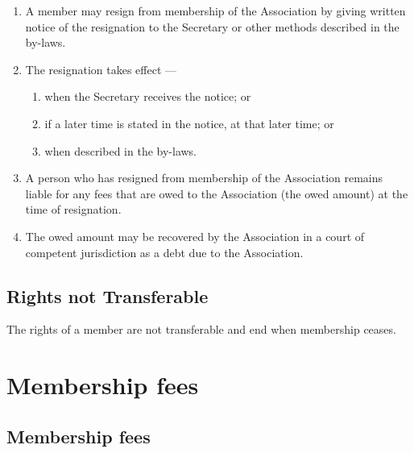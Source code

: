 \documentclass[../constitution.tex]{subfiles}
\begin{document}
\begin{enumerate}

\item A member may resign from membership of the Association by giving written notice of the resignation to the Secretary or other methods described in the by-laws.
\item The resignation takes effect ---

  \begin{enumerate}
  
  \item when the Secretary receives the notice; or
  \item if a later time is stated in the notice, at that later time; or
  \item when described in the by-laws.
  \end{enumerate}
\item A person who has resigned from membership of the Association remains liable for any fees that are owed to the Association (the owed amount) at the time of resignation.
\item The owed amount may be recovered by the Association in a court of competent jurisdiction as a debt due to the Association.
\end{enumerate}

\subsection{Rights not Transferable} \label{rights-not-transferable}

The rights of a member are not transferable and end when membership ceases.

\section{Membership fees} \label{division-2-membership-fees}

\subsection{Membership fees} \label{membership-fees}
\end{document}

